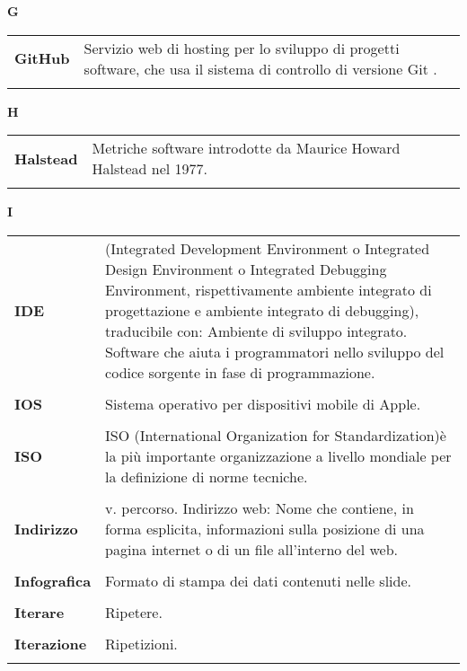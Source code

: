 \hfill\Huge{\textbf{G}} \\ 
\normalsize 
\begin{longtable}{L{4cm} p{10cm}}
\textbf{GitHub} & Servizio web di hosting per lo sviluppo di progetti software, che usa il sistema di controllo di versione Git . \\ 
 \\ 
\end{longtable} 
\newpage 
{} 
{} 
\hfill\Huge{\textbf{H}} \\ 
\normalsize 
\begin{longtable}{L{4cm} p{10cm}}
\textbf{Halstead} & Metriche software introdotte da Maurice Howard Halstead nel 1977. \\ 
 \\ 
\end{longtable} 
\newpage 
{} 
{} 
\hfill\Huge{\textbf{I}} \\ 
\normalsize 
\begin{longtable}{L{4cm} p{10cm}}
\textbf{IDE} & (Integrated Development Environment o Integrated Design Environment o Integrated Debugging Environment, rispettivamente ambiente integrato di progettazione e ambiente integrato di debugging), traducibile con: Ambiente di sviluppo integrato. Software che aiuta i programmatori nello sviluppo del codice sorgente in fase di programmazione. \\ 
 \\ 
\textbf{IOS} & Sistema operativo per dispositivi mobile di Apple. \\ 
 \\ 
\textbf{ISO} & ISO (International Organization for Standardization)è la più importante organizzazione a livello mondiale per la definizione di norme tecniche. \\ 
 \\ 
\textbf{Indirizzo} & v. percorso. Indirizzo web: Nome che contiene, in forma esplicita, informazioni sulla posizione di una pagina internet o di un file all'interno del web. \\ 
 \\ 
\textbf{Infografica} & Formato di stampa dei dati contenuti nelle slide. \\ 
 \\ 
\textbf{Iterare} & Ripetere. \\ 
 \\ 
\textbf{Iterazione} & Ripetizioni. \\ 
 \\ 
\end{longtable} 
